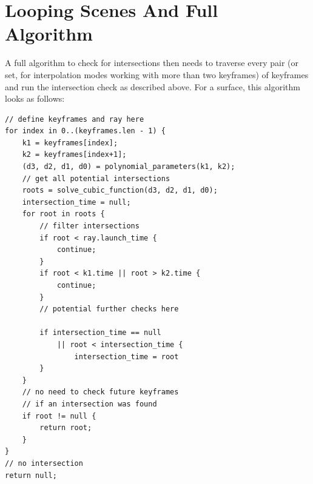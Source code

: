 \section{Looping Scenes And Full Algorithm}

A full algorithm to check for intersections then needs to traverse every pair
(or set, for interpolation modes working with more than two keyframes) of keyframes
and run the intersection check as described above.
\newline
For a surface, this algorithm looks as follows:

\begin{verbatim}
// define keyframes and ray here
for index in 0..(keyframes.len - 1) {
    k1 = keyframes[index];
    k2 = keyframes[index+1];
    (d3, d2, d1, d0) = polynomial_parameters(k1, k2);
    // get all potential intersections
    roots = solve_cubic_function(d3, d2, d1, d0);
    intersection_time = null;
    for root in roots {
        // filter intersections
        if root < ray.launch_time {
            continue;
        }
        if root < k1.time || root > k2.time {
            continue;
        }
        // potential further checks here

        if intersection_time == null
            || root < intersection_time {
                intersection_time = root
        }
    }
    // no need to check future keyframes
    // if an intersection was found
    if root != null {
        return root;
    }
}
// no intersection
return null;
\end{verbatim}